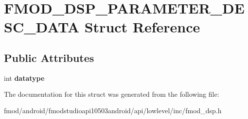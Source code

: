 \hypertarget{struct_f_m_o_d___d_s_p___p_a_r_a_m_e_t_e_r___d_e_s_c___d_a_t_a}{\section{F\+M\+O\+D\+\_\+\+D\+S\+P\+\_\+\+P\+A\+R\+A\+M\+E\+T\+E\+R\+\_\+\+D\+E\+S\+C\+\_\+\+D\+A\+T\+A Struct Reference}
\label{struct_f_m_o_d___d_s_p___p_a_r_a_m_e_t_e_r___d_e_s_c___d_a_t_a}
}
\subsection*{Public Attributes}
\begin{DoxyCompactItemize}
\item 
\hypertarget{struct_f_m_o_d___d_s_p___p_a_r_a_m_e_t_e_r___d_e_s_c___d_a_t_a_aa94b252f2f5f93d42490e3b5f3f6f38c}{int {\bfseries datatype}}\label{struct_f_m_o_d___d_s_p___p_a_r_a_m_e_t_e_r___d_e_s_c___d_a_t_a_aa94b252f2f5f93d42490e3b5f3f6f38c}

\end{DoxyCompactItemize}


The documentation for this struct was generated from the following file\+:\begin{DoxyCompactItemize}
\item 
fmod/android/fmodstudioapi10503android/api/lowlevel/inc/fmod\+\_\+dsp.\+h\end{DoxyCompactItemize}
